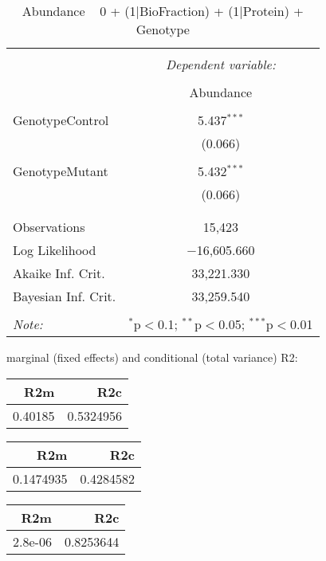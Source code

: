 \documentclass[11pt]{report}
\begin{document}
\begin{table}[!htbp] \centering 
  \caption{Abundance ~ 0 + (1|BioFraction) + (1|Protein) + Genotype} 
  \label{} 
\begin{tabular}{@{\extracolsep{5pt}}lc} 
\\[-1.8ex]\hline 
\hline \\[-1.8ex] 
 & \multicolumn{1}{c}{\textit{Dependent variable:}} \\ 
\cline{2-2} 
\\[-1.8ex] & Abundance \\ 
\hline \\[-1.8ex] 
 GenotypeControl & 5.437$^{***}$ \\ 
  & (0.066) \\ 
  & \\ 
 GenotypeMutant & 5.432$^{***}$ \\ 
  & (0.066) \\ 
  & \\ 
\hline \\[-1.8ex] 
Observations & 15,423 \\ 
Log Likelihood & $-$16,605.660 \\ 
Akaike Inf. Crit. & 33,221.330 \\ 
Bayesian Inf. Crit. & 33,259.540 \\ 
\hline 
\hline \\[-1.8ex] 
\textit{Note:}  & \multicolumn{1}{r}{$^{*}$p$<$0.1; $^{**}$p$<$0.05; $^{***}$p$<$0.01} \\ 
\end{tabular} 
\end{table} 
marginal (fixed effects) and conditional (total variance) R2:

\begin{tabular}{r|r}
\hline
R2m & R2c\\
\hline
0.40185 & 0.5324956\\
\hline
\end{tabular}

\begin{tabular}{r|r}
\hline
R2m & R2c\\
\hline
0.1474935 & 0.4284582\\
\hline
\end{tabular}

\begin{tabular}{r|r}
\hline
R2m & R2c\\
\hline
2.8e-06 & 0.8253644\\
\hline
\end{tabular}
\end{document}
